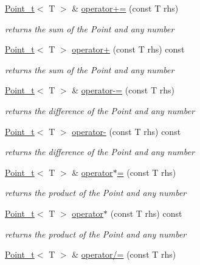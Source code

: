 \begin{DoxyCompactItemize}
\hyperlink{class_point__t}{Point\+\_\+t}$<$ T $>$ \& \hyperlink{class_point__t_adf6b36a63ecb3250ee9f35f1611e9393}{operator+=} (const T rhs)
\begin{DoxyCompactList}\small\item\em returns the sum of the Point and any number \end{DoxyCompactList}\item 
\hyperlink{class_point__t}{Point\+\_\+t}$<$ T $>$ \hyperlink{class_point__t_a18aa50064d17f83d4880ecafbc1cc115}{operator+} (const T rhs) const
\begin{DoxyCompactList}\small\item\em returns the sum of the Point and any number \end{DoxyCompactList}\item 
\hyperlink{class_point__t}{Point\+\_\+t}$<$ T $>$ \& \hyperlink{class_point__t_a52e5fc5e911f05b8e88fd918110dd502}{operator-\/=} (const T rhs)
\begin{DoxyCompactList}\small\item\em returns the difference of the Point and any number \end{DoxyCompactList}\item 
\hyperlink{class_point__t}{Point\+\_\+t}$<$ T $>$ \hyperlink{class_point__t_a6c180a0384480acf4929b75557d96748}{operator-\/} (const T rhs) const
\begin{DoxyCompactList}\small\item\em returns the difference of the Point and any number \end{DoxyCompactList}\item 
\hyperlink{class_point__t}{Point\+\_\+t}$<$ T $>$ \& \hyperlink{class_point__t_a0671ae26709b67542a902f4cbf1e2102}{operator$\ast$=} (const T rhs)
\begin{DoxyCompactList}\small\item\em returns the product of the Point and any number \end{DoxyCompactList}\item 
\hyperlink{class_point__t}{Point\+\_\+t}$<$ T $>$ \hyperlink{class_point__t_a6e2924110e74cc78027171765fb3eb84}{operator$\ast$} (const T rhs) const
\begin{DoxyCompactList}\small\item\em returns the product of the Point and any number \end{DoxyCompactList}\item 
\hyperlink{class_point__t}{Point\+\_\+t}$<$ T $>$ \& \hyperlink{class_point__t_a9035ca1de1358b7447d1c04a00c0b08e}{operator/=} (const T rhs)

\end{DoxyCompactItemize}
